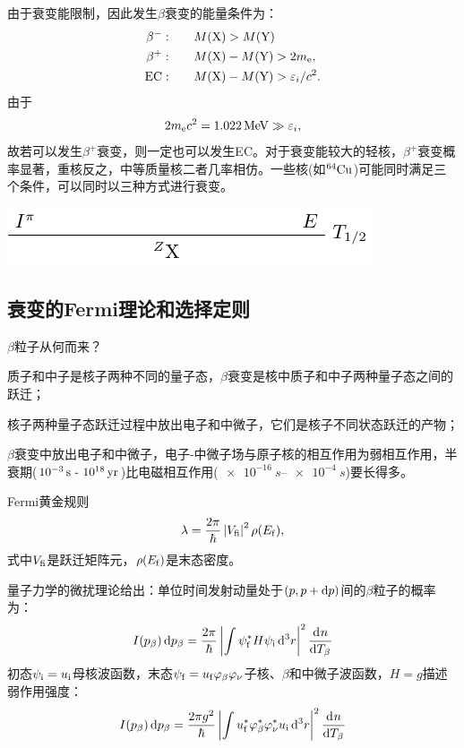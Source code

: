 由于衰变能限制，因此发生$\beta$衰变的能量条件为：
\begin{align}
	\beta^-:&\qquad M(\mathrm{X})>M(\mathrm{Y})\\
	\beta^+:&\qquad M(\mathrm{X})-M(\mathrm{Y}) > 2m_\mathrm e,\\
	\mathrm{EC}:&\qquad M(\mathrm{X})-M(\mathrm{Y}) > \varepsilon_i / c^2.
\end{align}
由于
\[
	2m_\mathrm e c^2=\SI{1.022}{MeV}\gg\varepsilon_i,
\]
故若可以发生$\beta^+$衰变，则一定也可以发生EC。对于衰变能较大的轻核，$\beta^+$衰变概率显著，重核反之，中等质量核二者几率相仿。一些核(如${^{64}\mathrm{Cu}}$)可能同时满足三个条件，可以同时以三种方式进行衰变。
\begin{center}
	\includegraphics[page=6]{figures/tikz/layouts.pdf}
\end{center}

\subsection{\textbeta 衰变的Fermi理论和选择定则}

$\beta$粒子从何而来？
\begin{compactenum}
	\item 质子和中子是核子两种不同的量子态，$\beta$衰变是核中质子和中子两种量子态之间的跃迁；
	\item 核子两种量子态跃迁过程中放出电子和中微子，它们是核子不同状态跃迁的产物；
	\item $\beta$衰变中放出电子和中微子，电子-中微子场与原子核的相互作用为弱相互作用，半衰期($\SI{e-3}{s}~\text{-}~\SI{e18}{yr}$)比电磁相互作用($\SIrange{e-16}{e-4}{s}$)要长得多。
\end{compactenum}
Fermi黄金规则
\begin{align}
	\lambda = \frac{2\pi}\hbar\left\lvert V_{\mathrm{f}\mathrm{i}}\right\rvert^2\rho(E_{\mathrm{f}}),
\end{align}
式中$V_{\fin\ini}$是跃迁矩阵元，$\rho(E_{\mathrm{f}})$是末态密度。

量子力学的微扰理论给出：单位时间发射动量处于$(p,p+\mathop{}\!\mathrm{d} p)$间的$\beta$粒子的概率为：
\[
	I(p_\beta)\mathop{}\!\mathrm{d} p_\beta=\frac{2\pi}\hbar\left\lvert\int\psi_{\mathrm{f}}^\ast H\psi_{\mathrm{i}}\mathop{}\!\mathrm{d}^3r\right\rvert^2\frac{\mathrm{d}^{{}}n}{\mathrm{d}{T_\beta}^{{}}}
\]
初态$\psi_{\mathrm{i}}=u_{\mathrm{i}}$母核波函数，末态$\psi_{\mathrm{f}}=u_{\mathrm{f}}\varphi_\beta\varphi_\nu$子核、$\beta$和中微子波函数，$H=g$描述弱作用强度：
\[
	I(p_\beta)\mathop{}\!\mathrm{d} p_\beta=\frac{2\pi g^2}\hbar\left\lvert\int u_{\mathrm{f}}^\ast\varphi_\beta^\ast\varphi_\nu^\ast u_{\mathrm{i}}\mathop{}\!\mathrm{d}^3r\right\rvert^2\frac{\mathrm{d}^{{}}n}{\mathrm{d}{T_\beta}^{{}}}
\]

